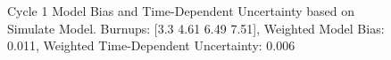 \begin{figure}[htbp]
{\begin{tikzpicture}[x=1in,y=1in]
      \end{tikzpicture}
    }
    


    \caption{Cycle 1 Model Bias and Time-Dependent Uncertainty based on Simulate Model. Burnups: [3.3 4.61 6.49 7.51], Weighted Model Bias: 0.011, Weighted Time-Dependent Uncertainty: 0.006 \label{fig:sim-cyc1-eighth-map-3.3-4.61-6.49-7.51}}
\end{figure}

